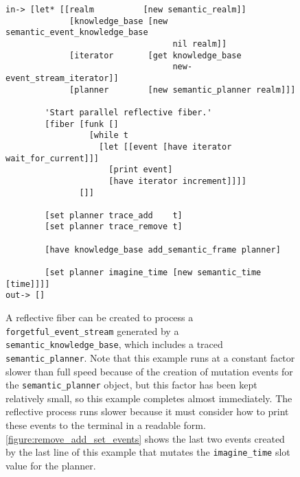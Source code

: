 \begin{figure}[h]
\centering
{\small
\begin{Verbatim}[frame=single]
 in-> [let* [[realm          [new semantic_realm]]
             [knowledge_base [new semantic_event_knowledge_base
                                  nil realm]]
             [iterator       [get knowledge_base
                                  new-event_stream_iterator]]
             [planner        [new semantic_planner realm]]]

        'Start parallel reflective fiber.'
        [fiber [funk []
                 [while t
                   [let [[event [have iterator wait_for_current]]]
                     [print event]
                     [have iterator increment]]]]
               []]
        
        [set planner trace_add    t]
        [set planner trace_remove t]
        
        [have knowledge_base add_semantic_frame planner]
        
        [set planner imagine_time [new semantic_time [time]]]]
out-> []
\end{Verbatim}
}
\caption[A reflective fiber can be created to process an
  {\tt{forgetful\_event\_stream}}.]{A reflective fiber can be created
  to process a {\tt{forgetful\_event\_stream}} generated by a
  {\tt{semantic\_knowledge\_base}}, which includes a traced
  {\tt{semantic\_planner}}.  Note that this example runs at a constant
  factor slower than full speed because of the creation of mutation
  events for the {\tt{semantic\_planner}} object, but this factor has
  been kept relatively small, so this example completes almost
  immediately.  The reflective process runs slower because it must
  consider how to print these events to the terminal in a readable
  form.  {\mbox{\autoref{figure:remove_add_set_events}}} shows the
  last two events created by the last line of this example that
  mutates the {\tt{imagine\_time}} slot value for the planner.}
\label{figure:reflective_fiber}
\end{figure}

